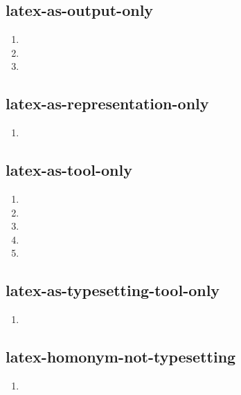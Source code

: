 \documentclass{article}
\begin{document}
\subsection{latex-as-output-only}
\begin{enumerate}
\item {}
\item {}
\item {}
\end{enumerate}

\subsection{latex-as-representation-only}
\begin{enumerate}
\item {}
\end{enumerate}

\subsection{latex-as-tool-only}
\begin{enumerate}
\item {}
\item {}
\item {}
\item {}
\item {}
\end{enumerate}

\subsection{latex-as-typesetting-tool-only}
\begin{enumerate}
\item {}
\end{enumerate}

\subsection{latex-homonym-not-typesetting}
\begin{enumerate}
\item {}
\end{enumerate}
\end{document}
